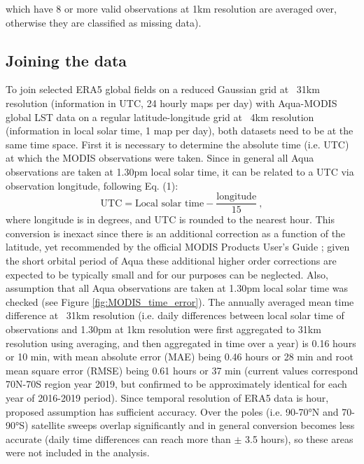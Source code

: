\documentclass[hess, twostagejnl]{copernicus}
\begin{document}
which have 8 or more valid observations at 1km resolution are averaged over, otherwise they are classified as missing data).




\subsection{Joining the data}\label{sec:join}
To join selected ERA5 global fields on a reduced Gaussian grid at ~31km resolution (information in UTC, 24 hourly maps per day) with Aqua-MODIS global LST data on a regular latitude-longitude grid at ~4km resolution (information in local solar time, 1 map per day), both datasets need to be at the same time space. First it is necessary to determine the absolute time (i.e. UTC) at which the MODIS observations were taken. Since in general all Aqua observations are taken at 1.30pm local solar time, it can be related to a UTC via observation longitude, following Eq. (1):
\begin{equation}
	\text{UTC} = \text{Local solar time} - \frac{\text{longitude}}{15} \ , 
\end{equation}
where longitude is in degrees, and UTC is rounded to the nearest hour. This conversion is inexact since there is an additional correction as a function of the latitude, yet recommended by the official MODIS Products User’s Guide \cite{MODISusersguide}; given the short orbital period of Aqua these additional higher order corrections are expected to be typically small and for our purposes can be neglected. Also, assumption that all Aqua observations are taken at 1.30pm local solar time was checked (see Figure \ref{fig:MODIS_time_error}). The annually averaged mean time difference at ~31km resolution (i.e. daily differences between local solar time of observations and 1.30pm at 1km resolution were first aggregated to 31km resolution using averaging, and then aggregated in time over a year) is 0.16 hours or 10 min, with mean absolute error (MAE) being 0.46 hours or 28 min and root mean square error (RMSE) being 0.61 hours or 37 min (current values correspond 70N-70S region year 2019, but confirmed to be approximately identical for each year of 2016-2019 period). Since temporal resolution of ERA5 data is hour, proposed assumption has sufficient accuracy. Over the poles (i.e. 90-70°N and 70-90°S) satellite sweeps overlap significantly and in general conversion becomes less accurate (daily time differences can reach more than $\pm$ 3.5 hours), so these areas were not included in the analysis. \newline 
\end{document}

